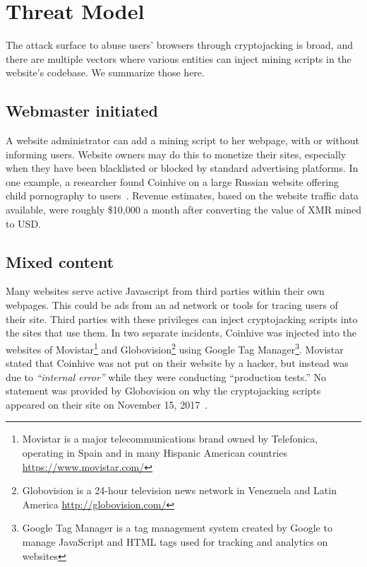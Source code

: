 
%
%
%
%
%
%

\section{Threat Model}

The attack surface to abuse users' browsers through cryptojacking is broad, and there are multiple vectors where various entities can inject mining scripts in the website's codebase. We summarize those here. 

\subsection{Webmaster initiated} 

A website administrator can add a mining script to her webpage, with or without informing users. Website owners may do this to monetize their sites, especially when they have been blacklisted or blocked by standard advertising platforms. In one example, a researcher found Coinhive on a large Russian website offering child pornography to users~\cite{coinhiveonchildporn}. Revenue estimates, based on the website traffic data available, were roughly \$10,000 a month after converting the value of XMR mined to USD.

\subsection{Mixed content} 

Many websites serve active Javascript from third parties within their own webpages. This could be ads from an ad network or tools for tracing users of their site. Third parties with these privileges can inject cryptojacking scripts into the sites that use them. In two separate incidents, Coinhive was injected into the websites of Movistar\footnote{Movistar is a major telecommunications brand owned by Telefonica, operating in Spain and in many Hispanic American countries \url{https://www.movistar.com/}} and Globovision\footnote{Globovision is a 24-hour television news network in Venezuela and Latin America \url{http://globovision.com/}} using Google Tag Manager\footnote{Google Tag Manager is a tag management system created by Google to manage JavaScript and HTML tags used for tracking and analytics on websites}. Movistar stated that Coinhive was not put on their website by a hacker, but instead was due to \textit{``internal error''} while they were conducting ``production tests.'' No statement was provided by Globovision on why the cryptojacking scripts appeared on their site on November 15, 2017~\cite{googletagcoinhive}.

